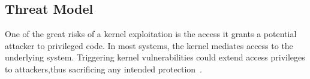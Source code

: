 

\subsection{Threat Model}

One of the great risks of a kernel exploitation is the access
it grants a potential attacker to privileged code. In most systems, the kernel
mediates access to the underlying system. Triggering kernel vulnerabilities
could extend access privileges
to attackers,thus sacrificing any intended protection~\cite{Repy-10}.


